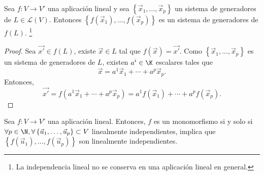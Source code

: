 \begin{fprop}[]
	\normalfont Sea $\displaystyle f: V \to V' $ una aplicación lineal y sea $\displaystyle \left\{ \vec{x}_{1}, \ldots, \vec{x}_{p}\right\}  $ un sistema de generadores de $\displaystyle L \in \mathcal{L}\left(V\right) $. Entonces $\displaystyle \left\{ f\left(\vec{x}_{1}\right), \ldots, f\left(\vec{x}_{p}\right)\right\}  $ es un sistema de generadores de $\displaystyle f\left(L\right) $.
\footnote{La independencia lineal no se conserva en una aplicación lineal en general.} 
\end{fprop}

\begin{proof}
	Sea $\displaystyle \vec{x'} \in f\left(L\right) $, existe $\displaystyle \vec{x} \in L $ tal que $\displaystyle f\left(\vec{x}\right) = \vec{x'} $. Como $\displaystyle \left\{ \vec{x}_{1}, \ldots, \vec{x}_{p}\right\}  $ es un sistema de generadores de $\displaystyle L $, existen $\displaystyle a^{i}\in\K $ escalares tales que 
	\[\vec{x} = a^{1}\vec{x}_{1} + \cdots + a^{p}\vec{x}_{p}.\]
Entonces, 
\[\vec{x'} = f\left(a^{1}\vec{x}_{1} + \cdots + a^{p}\vec{x}_{p}\right) = a^{1}f\left(\vec{x}_{1}\right) + \cdots + a^{p}f\left(\vec{x}_{p}\right) .\]
\end{proof}

\begin{ftheorem}[]
	\normalfont Sea $\displaystyle f : V \to V' $ una aplicación lineal. Entonces, $\displaystyle f $ es un monomorfismo si y solo si $\displaystyle \forall p \in \N, \forall \left\{ \vec{u}_{1}, \ldots, \vec{u}_{p}\right\} \subset V $ linealmente independientes, implica que $\displaystyle \left\{ f\left(\vec{u}_{1}\right), \ldots, f\left(\vec{u}_{p}\right)\right\}  $ son linealmente independientes.
\end{ftheorem}

